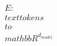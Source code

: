\documentclass[preview]{standalone}
\begin{document}
\begin{align*}
E: \\text{tokens} \\to \\mathbb{R}^{d_{model}}
\end{align*}
\end{document}
